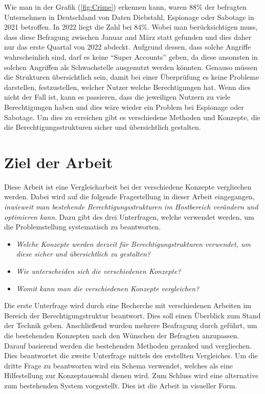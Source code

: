 Wie man in der Grafik (\ref{fig:Crime}) erkennen kann, waren 88\% der befragten Unternehmen in Deutschland von Daten Diebstahl, Espionage oder Sabotage in 2021 betroffen.
In 2022 liegt die Zahl bei 84\%.
Wobei man berücksichtigen muss, dass diese Befragung zwischen Januar and März statt gefunden und dies daher nur das erste Quartal von 2022 abdeckt.
Aufgrund dessen, dass solche Angriffe wahrscheinlich sind, darf es keine "`Super Accounts"' geben, da diese ansonsten in solchen Angriffen als Schwachstelle ausgenutzt werden könnten.
Genauso müssen die Strukturen übersichtlich sein, damit bei einer Überprüfung es keine Probleme darstellen, festzustellen, welcher Nutzer welche Berechtigungen hat.
Wenn dies nicht der Fall ist, kann es passieren, dass die jeweiligen Nutzern zu viele Berechtigungen haben und dies wäre wieder ein Problem bei Espionage oder Sabotage.
Um dies zu erreichen gibt es verschiedene Methoden und Konzepte, die die Berechtigungsstrukturen sicher und übersichtlich gestalten.

%
%
\section{Ziel der Arbeit}
\label{sec:intro:goal}
Diese Arbeit ist eine Vergleicharbeit bei der verschiedene Konzepte vergliechen werden.
Dabei wird auf die folgende Fragestellung in dieser Arbeit eingegangen, \textit{inwieweit man bestehende Berechtigungsstrukturen im Hostbereich verändern und optimieren kann}.
Dazu gibt des drei Unterfragen, welche verwendet werden, um die Problemstellung systematisch zu beantworten.

\begin{itemize}
  \item \textit{Welche Konzepte werden derzeit für Berechtigungstrukturen verwendet, um diese sicher und übersichtlich zu gestalten?}
  \item \textit{Wie unterscheiden sich die verschiedenen Konzepte?}
  \item \textit{Womit kann man die verschiedenen Konzepte vergleichen?}
\end{itemize}

Die erste Unterfrage wird durch eine Recherche mit verschiedenen Arbeiten im Bereich der Berechtigungstruktur beantwort.
Dies soll einen Überblick zum Stand der Technik geben.
Anschließend wurden mehrere Beafragung durch geführt, um die bestehenden Konzepten nach den Wünschen der Befragten anzupassen.
Darauf basierend werden die bestehenden Methoden geranked und vergliechen.
Dies beantwortet die zweite Unterfrage mittels des erstellten Vergleiches.
\newline
Um die dritte Frage zu beantworten wird ein Schema verwendet, welches als eine Hilfestellung zur Konzeptauswahl dienen wird.
Zum Schluss wird eine alternative zum bestehenden System vorgestellt.
Dies ist die Arbeit in visueller Form.

